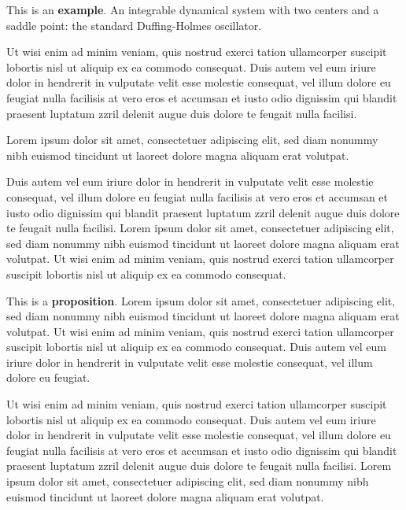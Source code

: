 \documentclass[oldfontcommands,6x9]{pupbook}
\begin{document}
\begin{example}
This is an \textbf{example}. An integrable dynamical system with two centers and a saddle point: the standard
Duffing-Holmes oscillator.
\end{example}

Ut wisi enim ad minim veniam, quis nostrud exerci tation ullamcorper
suscipit lobortis nisl ut aliquip ex ea commodo consequat. Duis autem
vel eum iriure dolor in hendrerit in vulputate velit esse molestie
consequat, vel illum dolore eu feugiat nulla facilisis at vero eros et
accumsan et iusto odio dignissim qui blandit praesent luptatum zzril
delenit augue duis dolore te feugait nulla facilisi. 

\begin{remark}
Lorem ipsum dolor
sit amet, consectetuer adipiscing elit, sed diam nonummy nibh euismod
tincidunt ut laoreet dolore magna aliquam erat volutpat. 
\end{remark}


Duis autem vel eum iriure dolor in hendrerit in vulputate velit esse
molestie consequat, vel illum dolore eu feugiat nulla facilisis at vero
eros et accumsan et iusto odio dignissim qui blandit praesent luptatum
zzril delenit augue duis dolore te feugait nulla facilisi. Lorem ipsum
dolor sit amet, consectetuer adipiscing elit, sed diam nonummy nibh
euismod tincidunt ut laoreet dolore magna aliquam erat volutpat. Ut wisi
enim ad minim veniam, quis nostrud exerci tation ullamcorper suscipit
lobortis nisl ut aliquip ex ea commodo consequat. 

\begin{proposition}
This is a \textbf{proposition}. Lorem ipsum dolor sit amet, consectetuer adipiscing elit, sed diam
nonummy nibh euismod tincidunt ut laoreet dolore magna aliquam erat
volutpat. Ut wisi enim ad minim veniam, quis nostrud exerci tation
ullamcorper suscipit lobortis nisl ut aliquip ex ea commodo consequat.
Duis autem vel eum iriure dolor in hendrerit in vulputate velit esse
molestie consequat, vel illum dolore eu feugiat. 
\end{proposition}

Ut wisi enim ad minim veniam, quis nostrud exerci tation ullamcorper
suscipit lobortis nisl ut aliquip ex ea commodo consequat. Duis autem
vel eum iriure dolor in hendrerit in vulputate velit esse molestie
consequat, vel illum dolore eu feugiat nulla facilisis at vero eros et
accumsan et iusto odio dignissim qui blandit praesent luptatum zzril
delenit augue duis dolore te feugait nulla facilisi. Lorem ipsum dolor
sit amet, consectetuer adipiscing elit, sed diam nonummy nibh euismod
tincidunt ut laoreet dolore magna aliquam erat
 volutpat.
\end{document}
